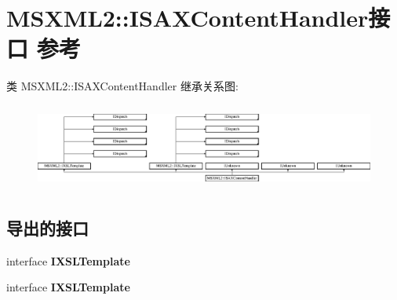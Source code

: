 \hypertarget{interface_m_s_x_m_l2_1_1_i_s_a_x_content_handler}{}\section{M\+S\+X\+M\+L2\+:\+:I\+S\+A\+X\+Content\+Handler接口 参考}
\label{interface_m_s_x_m_l2_1_1_i_s_a_x_content_handler}
类 M\+S\+X\+M\+L2\+:\+:I\+S\+A\+X\+Content\+Handler 继承关系图\+:\begin{figure}[H]
\begin{center}
\leavevmode
\includegraphics[height=2.857143cm]{interface_m_s_x_m_l2_1_1_i_s_a_x_content_handler}
\end{center}
\end{figure}
\subsection*{导出的接口}
\begin{DoxyCompactItemize}
\item 
\mbox{\label{interface_m_s_x_m_l2_1_1_i_s_a_x_content_handler_a1c993f463a32c761071dd86c71c84457}} 
interface {\bfseries I\+X\+S\+L\+Template}
\item 
\mbox{\label{interface_m_s_x_m_l2_1_1_i_s_a_x_content_handler_a1c993f463a32c761071dd86c71c84457}} 
interface {\bfseries I\+X\+S\+L\+Template}
\end{DoxyCompactItemize}
